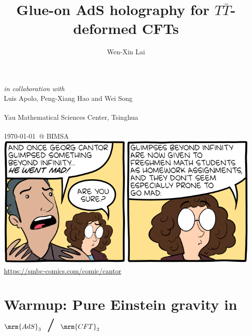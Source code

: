 \documentclass[10pt]{article}
\title{Glue-on AdS holography for $T\bar T$-deformed CFTs}
\author{%
	Wen-Xin Lai
	\texstringonly{\,}\textkai{赖文昕}%
}
\date{}
\begin{document}
\setlength{\droptitle}{-3.5\baselineskip}
\maketitle
\thispagestyle{empty}

\vspace{-3.5\baselineskip}

\centering

\textit{in collaboration with}
\\[.8ex]
	{\large Luis Apolo,
	Peng-Xiang Hao 
	and Wei Song }
\\[2ex]
\\[3ex]
	\textsf{Yau Mathematical Sciences Center, Tsinghua}
\\[1ex]
	{\large\ccbyncsajp}
\\[2ex]
	\textsf{\today\ @ BIMSA}
\\[4ex]
	\includegraphics[height=.38\textheight]{img/smbc-cantor-cropped.png}
\\[-.5ex]
	{\footnotesize\url{https://smbc-comics.com/comic/cantor}}

\clearpage
\justifying

\large
\tableofcontents
\pagebreak

\section{\textbf{Warmup:} Pure Einstein gravity in $\mrm{AdS}_3$ / $\mrm{CFT}_2$}

\newcommand{\citeMaldacena}{%
	\textcite{Maldacena:1997re}
}

\newcommand{\stateAdsCft}{
\begin{align*}
	\textrm{Strings on $\mrm{AdS}_{d+1}$ background}
	&\ \equiv\ 
	\textrm{Conformal Field Theory $\mrm{CFT}_{d}$}
\\
	\textrm{\textit{asympt.}~$\mrm{AdS}_{d+1}$ Gravity}
	&\ \equiv\ 
	\textrm{Large $N$ $\mrm{CFT}_{d}$ at \textit{asympt.}~boundary}
\end{align*}
}
\end{document}
